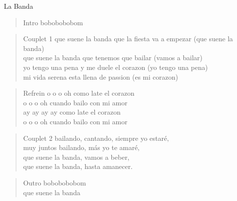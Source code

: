 
\begin{song}[takirari]{La Banda}
\begin{verse}{Intro}
bobobobobom
\end{verse}

\begin{verse}{Couplet 1}
que suene la banda que la fiesta va a empezar \hspace{3em}(que suene la banda)\\
que suene la banda que tenemos que bailar \hspace{3em}(vamos a bailar)\\
yo tengo una pena y me duele el corazon \hspace{3em}(yo tengo una pena)\\
mi vida serena esta llena de passion \hspace{3em}(es mi corazon)
\end{verse}

\begin{verse}{Refrein}
o o o oh \hspace{4em} como late el corazon\\
o o o oh \hspace{4em} cuando bailo con mi amor\\
\chord{}ay ay ay ay \hspace{2.7em} como late el corazon\\
o o o oh \hspace{4em} cuando bailo con mi amor
\end{verse}

\begin{verse}{Couplet 2}
bailando, cantando, siempre yo estaré‚\\
muy juntos bailando, más yo te amaré‚\\
que suene la banda, vamos a beber,\\
que suene la banda, hasta amanecer.\\
\end{verse}

\begin{verse}{Outro}
bobobobobom\\
que suene la banda
\end{verse}

\end{song}
